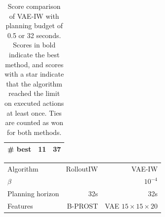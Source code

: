 \begin{table}[ht]
\begin{center}
\begin{small}
\begin{tabular}{lrr}
\midrule
\# best & 11 & 37 \\
\bottomrule

\end{tabular}
\caption{Score comparison of VAE-IW with planning budget of 0.5 or 32 seconds. Scores in bold indicate the best method, and scores with a star indicate that the algorithm reached the limit on executed actions at least once. Ties are counted as won for both methods.}
\label{tab:higher_time_budget}

\end{small}
\end{center}
\end{table}

\begin{table}[ht]
    \centering
\begin{center}
\begin{small}
\begin{tabular}{lrr}
\toprule
Algorithm & RolloutIW & VAE-IW \\
$\beta$ &  & $10^{-4}$\\
Planning horizon & 32s & 32s \\
Features & B-PROST &  VAE $15 \times 15 \times 20$ \\
\midrule



\end{tabular}
\end{small}
\end{center}
\end{table}
